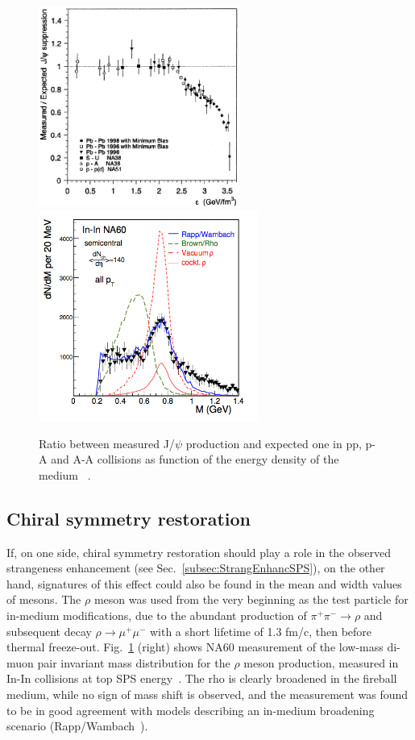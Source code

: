 \begin{figure}[!ht]
  \centering
  \includegraphics[width=6.6cm]{FigCap1/JPsiSuppressionNA50.eps}
  \includegraphics[width=7.2cm]{FigCap1/rhoMelting.png}
  \caption{Ratio between measured J/$\psi$ production and expected one in pp, p-A and A-A collisions as function of the energy density of the medium ~\cite{Abreu:2000ni}.}
  \label{fig:JPsiSuppressionNA50}
\end{figure}

\subsection{Chiral symmetry restoration}
\label{sec:ChiralSymm}
If, on one side, chiral symmetry restoration should play a role in the observed strangeness enhancement (see Sec.~\ref{subsec:StrangEnhancSPS}),
on the other hand, signatures of this effect could also be found in the mean and width values of mesons.
The $\rho$ meson was used from the very beginning as the test particle for in-medium modifications, due to the abundant production
of $\pi^+ \pi^- \rightarrow \rho$ and subsequent decay $\rho \rightarrow \mu^+ \mu^- $ with a short lifetime of 1.3 fm/c, then 
before thermal freeze-out. Fig.~\ref{fig:JPsiSuppressionNA50} (right) shows NA60 measurement of the 
low-mass di-muon pair invariant mass distribution for the
$\rho$ meson production, measured in In-In collisions at top SPS energy~\cite{Damjanovic:2005ni}. The rho is
clearly broadened in the fireball medium, while no sign of mass shift is observed, and the measurement
was found to be in good agreement with models describing an in-medium broadening scenario (Rapp/Wambach~\cite{Rapp:2012zq}).\\






